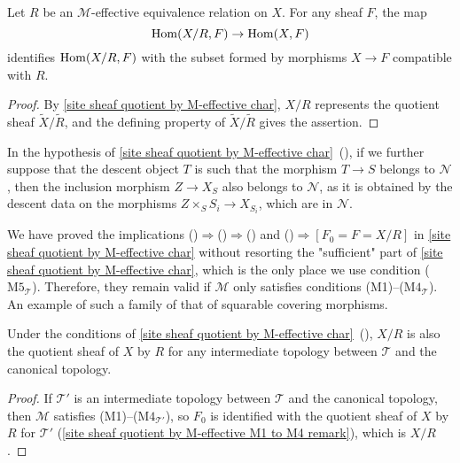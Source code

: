 \begin{corollary}\label{site sheaf quotient by M-effective Hom set char}
Let $R$ be an $\mathcal{M}$-effective equivalence relation on $X$. For any sheaf $F$, the map
\[\mathrm{Hom}(X/R,F)\to\mathrm{Hom}(X,F)\]
identifies $\mathrm{Hom}(X/R,F)$ with the subset formed by morphisms $X\to F$ compatible with $R$.
\end{corollary}
\begin{proof}
By \cref{site sheaf quotient by M-effective char}, $X/R$ represents the quotient sheaf $\widetilde{X}/\widetilde{R}$, and the defining property of $\widetilde{X}/\widetilde{R}$ gives the assertion.
\end{proof}

\begin{remark}\label{site sheaf quotient by M-effective descent morphism in N remark}
In the hypothesis of \cref{site sheaf quotient by M-effective char}~(), if we further suppose that the descent object $T$ is such that the morphism $T\to S$ belongs to $\mathcal{N}$, then the inclusion morphism $Z\to X_S$ also belongs to $\mathcal{N}$, as it is obtained by the descent data on the morphisms $Z\times_SS_i\to X_{S_i}$, which are in $\mathcal{N}$.
\end{remark}

\begin{remark}\label{site sheaf quotient by M-effective M1 to M4 remark}
We have proved the implications ()$\Rightarrow$()$\Rightarrow$() and ()$\Rightarrow$$[F_0=F=X/R]$ in \cref{site sheaf quotient by M-effective char} without resorting the "sufficient" part of \cref{site sheaf quotient by M-effective char}, which is the only place we use condition ($\text{M5}_\mathcal{T}$). Therefore, they remain valid if $\mathcal{M}$ only satisfies conditions (M1)--($\text{M4}_\mathcal{T}$). An example of such a family of that of squarable covering morphisms.
\end{remark}


\begin{corollary}\label{site sheaf quotient by M-effective quotient for subcanonical topology}
Under the conditions of \cref{site sheaf quotient by M-effective char}~(), $X/R$ is also the quotient sheaf of $X$ by $R$ for any intermediate topology between $\mathcal{T}$ and the canonical topology.
\end{corollary}
\begin{proof}
If $\mathcal{T}'$ is an intermediate topology between $\mathcal{T}$ and the canonical topology, then $\mathcal{M}$ satisfies (M1)--($\text{M4}_{\mathcal{T}'}$), so $F_0$ is identified with the quotient sheaf of $X$ by $R$ for $\mathcal{T}'$ (\cref{site sheaf quotient by M-effective M1 to M4 remark}), which is $X/R$.
\end{proof}

